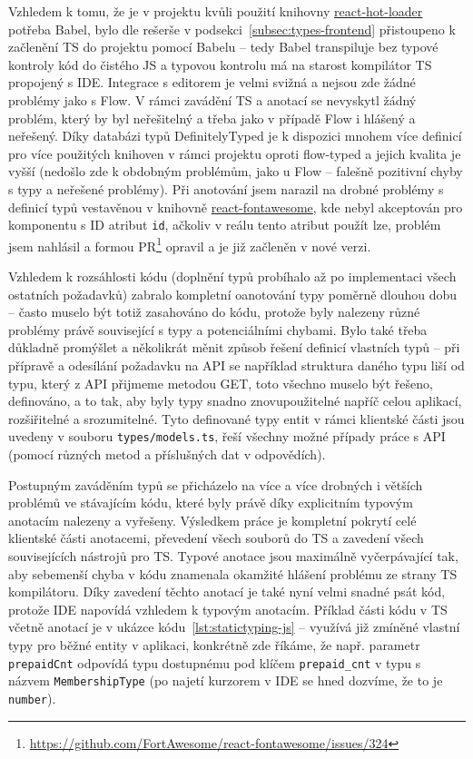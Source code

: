 Vzhledem k tomu, že je v projektu kvůli použití knihovny \href{https://github.com/gaearon/react-hot-loader}{react-hot-loader} potřeba Babel, bylo dle rešerše v podsekci~\ref{subsec:types-frontend} přistoupeno k začlenění TS do projektu pomocí Babelu -- tedy Babel transpiluje bez typové kontroly kód do čistého JS a typovou kontrolu má na starost kompilátor TS propojený s IDE. Integrace s editorem je velmi svižná a nejsou zde žádné problémy jako s Flow. V rámci zavádění TS a anotací se nevyskytl žádný problém, který by byl neřešitelný a třeba jako v případě Flow i hlášený a neřešený. Díky databázi typů DefinitelyTyped je k dispozici mnohem více definicí pro více použitých knihoven v rámci projektu oproti flow-typed a jejich kvalita je vyšší (nedošlo zde k obdobným problémům, jako u Flow -- falešně pozitivní chyby s typy a neřešené problémy). Při anotování jsem narazil na drobné problémy s definicí typů vestavěnou v knihovně \href{https://github.com/FortAwesome/react-fontawesome}{react-fontawesome}, kde nebyl akceptován pro komponentu s ID atribut \verb|id|, ačkoliv v reálu tento atribut použít lze, problém jsem nahlásil a formou PR\footnote{\url{https://github.com/FortAwesome/react-fontawesome/issues/324}} opravil a je již začleněn v nové verzi.

Vzhledem k rozsáhlosti kódu (doplnění typů probíhalo až po implementaci všech ostatních požadavků) zabralo kompletní oanotování typy poměrně dlouhou dobu -- často muselo být totiž zasahováno do kódu, protože byly nalezeny různé problémy právě související s typy a potenciálními chybami. Bylo také třeba důkladně promýšlet a několikrát měnit způsob řešení definicí vlastních typů -- při přípravě a odesílání požadavku na API se například struktura daného typu liší od typu, který z API přijmeme metodou GET, toto všechno muselo být řešeno, definováno, a to tak, aby byly typy snadno znovupoužitelné napříč celou aplikací, rozšiřitelné a srozumitelné. Tyto definované typy entit v rámci klientské části jsou uvedeny v souboru \verb|types/models.ts|, řeší všechny možné případy práce s API (pomocí různých metod a příslušných dat v odpovědích).

Postupným zaváděním typů se přicházelo na více a více drobných i větších problémů ve stávajícím kódu, které byly právě díky explicitním typovým anotacím nalezeny a vyřešeny. Výsledkem práce je kompletní pokrytí celé klientské části anotacemi, převedení všech souborů do TS a zavedení všech souvisejících nástrojů pro TS. Typové anotace jsou maximálně vyčerpávající tak, aby sebemenší chyba v kódu znamenala okamžité hlášení problému ze strany TS kompilátoru. Díky zavedení těchto anotací je také nyní velmi snadné psát kód, protože IDE napovídá vzhledem k typovým anotacím. Příklad části kódu v TS včetně anotací je v ukázce kódu~\ref{lst:statictyping-js} -- využívá již zmíněné vlastní typy pro běžné entity v aplikaci, konkrétně zde říkáme, že např. parametr \verb|prepaidCnt| odpovídá typu dostupnému pod klíčem \verb|prepaid_cnt| v typu s názvem \verb|MembershipType| (po najetí kurzorem v IDE se hned dozvíme, že to je \verb|number|).

